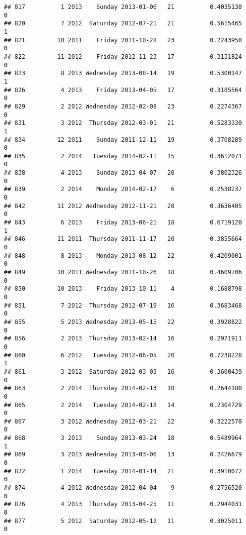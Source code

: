 \documentclass[
]{article}
\begin{document}
\begin{verbatim}
## 817          1 2013    Sunday 2013-01-06   21          0.4035130             0
## 820          7 2012  Saturday 2012-07-21   21          0.5615465             1
## 821         10 2011    Friday 2011-10-28   23          0.2243950             0
## 822         11 2012    Friday 2012-11-23   17          0.3131824             0
## 823          8 2013 Wednesday 2013-08-14   19          0.5300147             1
## 826          4 2013    Friday 2013-04-05   17          0.3185564             0
## 829          2 2012 Wednesday 2012-02-08   23          0.2274367             0
## 831          3 2012  Thursday 2012-03-01   21          0.5283330             1
## 834         12 2011    Sunday 2011-12-11   19          0.3708289             0
## 835          2 2014   Tuesday 2014-02-11   15          0.3612071             0
## 838          4 2013    Sunday 2013-04-07   20          0.3802326             0
## 839          2 2014    Monday 2014-02-17    6          0.2538237             0
## 842         11 2012 Wednesday 2012-11-21   20          0.3636405             0
## 843          6 2013    Friday 2013-06-21   18          0.6719120             1
## 846         11 2011  Thursday 2011-11-17   20          0.3855664             0
## 848          8 2013    Monday 2013-08-12   22          0.4209001             0
## 849         10 2011 Wednesday 2011-10-26   18          0.4609706             0
## 850         10 2013    Friday 2013-10-11    4          0.1688798             0
## 851          7 2012  Thursday 2012-07-19   16          0.3683468             0
## 855          5 2013 Wednesday 2013-05-15   22          0.3928822             0
## 856          2 2013  Thursday 2013-02-14   16          0.2971911             0
## 860          6 2012   Tuesday 2012-06-05   20          0.7238228             1
## 861          3 2012  Saturday 2012-03-03   16          0.3600439             0
## 863          2 2014  Thursday 2014-02-13   10          0.2644180             0
## 865          2 2014   Tuesday 2014-02-18   14          0.2304729             0
## 867          3 2012 Wednesday 2012-03-21   22          0.3222570             0
## 868          3 2013    Sunday 2013-03-24   18          0.5489964             1
## 869          3 2013 Wednesday 2013-03-06   13          0.2426679             0
## 872          1 2014   Tuesday 2014-01-14   21          0.3910072             0
## 874          4 2012 Wednesday 2012-04-04    9          0.2756520             0
## 876          4 2013  Thursday 2013-04-25   11          0.2944031             0
## 877          5 2012  Saturday 2012-05-12   11          0.3025011             0

\end{verbatim}
\end{document}
